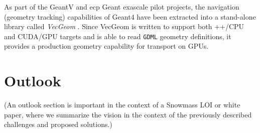 \documentclass[10pt]{article}
\begin{document}
As part of the GeantV and \ac{ecp} Geant exascale pilot projects, the navigation
(geometry tracking) capabilities of Geant4 have been extracted into a
stand-alone library called \emph{VecGeom} \cite{apostolakis_towards_2015}. Since
VecGeom is written to support both \C++/CPU and CUDA/GPU targets and is able to
read \texttt{GDML} geometry definitions, it provides a production geometry
capability for transport on GPUs.

\section*{Outlook}

(An outlook section is important in the context of a Snowmass LOI or white
paper, where we summarize the vision in the context of the previously described
challenges and proposed solutions.)

\pagebreak
\printbibliography

\end{document}
